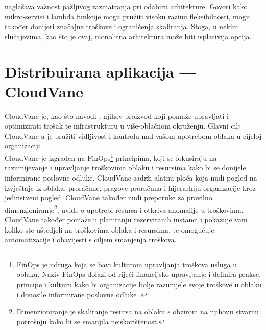 \documentclass[times, utf8, diplomski]{fer}
\begin{document}
\citet{kolny_scaling_2023} naglašava važnost pažljivog razmatranja pri odabiru arhitekture. Govori kako mikro-servisi i lambda funkcije mogu pružiti visoku razinu fleksibilnosti, mogu također donijeti značajne troškove i ograničenja skaliranja. Stoga, u nekim slučajevima, kao što je ovaj, monolitna arhitektura može biti isplativija opcija.



\chapter{Distribuirana aplikacija --- CloudVane}

CloudVane je, kao što navodi \citet{neos_cloudvane_nodate}, njihov proizvod koji pomaže upravljati i optimizirati trošak te infrastrukturu u više-oblačnom  okruženju. Glavni cilj CloudVane-a je pružiti vidljivost i kontrolu nad vašom upotrebom oblaka  u cijeloj organizaciji. \\

CloudVane je izgrađen na FinOps\footnote{FinOps je udruga koja se bavi kulturom upravljanja troškova usluga u oblaku. Naziv FinOps dolazi od riječi financijsko upravljanje i definira prakse, principe i kulturu kako bi organizacije bolje razumjele svoje troškove u oblaku i donosile informirane poslovne odluke \citep{finops_fundation_finops_nodate}.} principima, koji se fokusiraju na razumijevanje i upravljanje troškovima oblaku i resursima kako bi se donijele informirane poslovne odluke. CloudVane sadrži alatnu ploča  koja nudi pogled na izvještaje iz oblaka, proračune, pragove proračuna i hijerarhiju organizacije kroz jedinstveni pogled. CloudVane također nudi preporuke za pravilno dimenzioniranje\footnote{Dimenzioniranje je skaliranje resursa na oblaku s obzirom na njihovu stvarnu potrošnju kako bi se smanjila neiskorištenost.}, uvide o upotrebi resursa i otkriva anomalije u troškovima. CloudVane također pomaže u planiranju rezerviranih instanci i pokazuje vam koliko ste uštedjeli na troškovima oblaka i resursima, te omogućuje automatizacije i obavijesti s ciljem smanjenja troškova. \\
\end{document}
